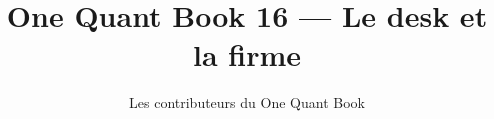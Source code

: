 \documentclass[11pt,a4paper,twoside,openany]{book}
\title{One Quant Book 16 --- Le desk et la firme}
\author{Les contributeurs du One Quant Book}
\date{\bookdate}
\begin{document}
\frontmatter



\tableofcontents

\mainmatter


\appendix
\part{\omsolutionspart}


\backmatter
\printindex
\end{document}

